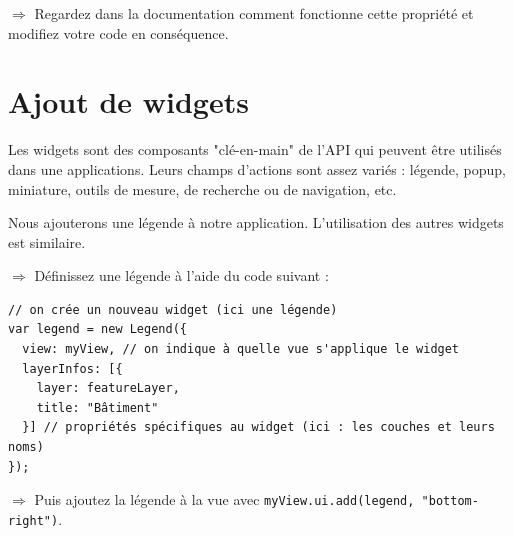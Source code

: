 \documentclass[11pt]{article}
\newcommand{\action}{$\Rightarrow$ }
\newcommand{\code}[1]{\lstinline{#1}}
\begin{document}
\action Regardez dans la documentation comment fonctionne cette propriété et modifiez votre code en conséquence.



\section{Ajout de widgets}
Les widgets sont des composants "clé-en-main" de l'API qui peuvent être utilisés dans une applications. Leurs champs d'actions sont assez variés : légende, popup, miniature, outils de mesure, de recherche ou de navigation, etc.

Nous ajouterons une légende à notre application. L'utilisation des autres widgets est similaire. 

\action Définissez une légende à l'aide du code suivant :
\begin{lstlisting}
// on crée un nouveau widget (ici une légende)
var legend = new Legend({
  view: myView, // on indique à quelle vue s'applique le widget
  layerInfos: [{ 
    layer: featureLayer,
    title: "Bâtiment"
  }] // propriétés spécifiques au widget (ici : les couches et leurs noms)
});
\end{lstlisting}

\action Puis ajoutez la légende à la vue avec \code{myView.ui.add(legend, "bottom-right")}.



\end{document}
